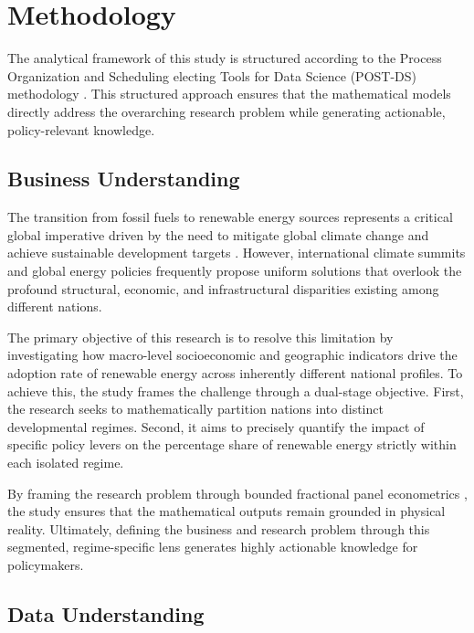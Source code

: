 \documentclass[a4paper,11pt]{article}
\begin{document}
\section{Methodology}
The analytical framework of this study is structured according to the Process Organization and Scheduling electing Tools for Data Science (POST-DS) methodology \parencite{costa2020post}.
This structured approach ensures that the mathematical models directly address the overarching research problem while generating actionable, policy-relevant knowledge.

\subsection{Business Understanding}
The transition from fossil fuels to renewable energy sources represents a critical global imperative driven by the need to mitigate global climate change and achieve sustainable development targets \parencite{unfccc2015}.
However, international climate summits and global energy policies frequently propose uniform solutions that overlook the profound structural, economic, and infrastructural disparities existing among different nations.

The primary objective of this research is to resolve this limitation by investigating how macro-level socioeconomic and geographic indicators drive the adoption rate of renewable energy across inherently different national profiles.
To achieve this, the study frames the challenge through a dual-stage objective. First, the research seeks to mathematically partition nations into distinct developmental regimes. Second, it aims to precisely quantify the impact of specific policy levers on the percentage share of renewable energy strictly within each isolated regime.

By framing the research problem through bounded fractional panel econometrics \parencite{papke2008panel}, the study ensures that the mathematical outputs remain grounded in physical reality.
Ultimately, defining the business and research problem through this segmented, regime-specific lens generates highly actionable knowledge for policymakers.

\subsection{Data Understanding}
\end{document}
